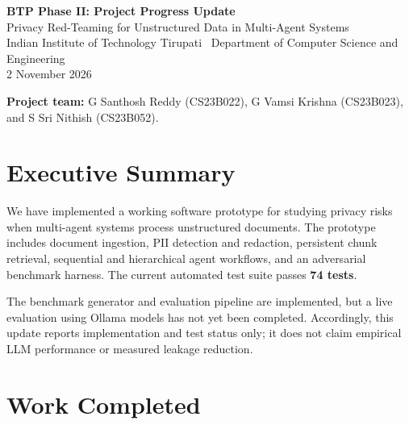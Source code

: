 \documentclass[11pt,a4paper]{article}
\begin{document}
\begin{center}
    {\Large\bfseries\color{primaryblue} BTP Phase II: Project Progress Update}\\[5pt]
    {\large Privacy Red-Teaming for Unstructured Data in Multi-Agent Systems}\\[8pt]
    {\normalsize Indian Institute of Technology Tirupati \textbar\
    Department of Computer Science and Engineering}\\[4pt]
    {\normalsize 2 November 2026}
\end{center}

\vspace{8pt}
\noindent\textbf{Project team:}
G Santhosh Reddy (CS23B022), G Vamsi Krishna (CS23B023), and
S Sri Nithish (CS23B052).

\section{Executive Summary}

We have implemented a working software prototype for studying privacy risks
when multi-agent systems process unstructured documents. The prototype includes
document ingestion, PII detection and redaction, persistent chunk retrieval,
sequential and hierarchical agent workflows, and an adversarial benchmark
harness. The current automated test suite passes \textbf{74 tests}.

The benchmark generator and evaluation pipeline are implemented, but a live
evaluation using Ollama models has not yet been completed. Accordingly, this
update reports implementation and test status only; it does not claim empirical
LLM performance or measured leakage reduction.

\section{Work Completed}
\end{document}
